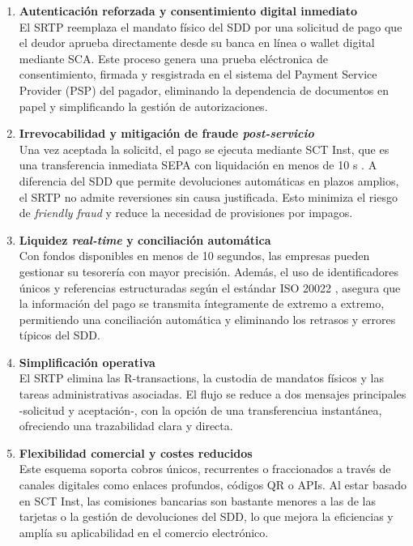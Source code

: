 \begin{enumerate}[label=\alph*)]
  \item \textbf{Autenticación reforzada y consentimiento digital inmediato}\\
      El SRTP reemplaza el mandato físico del SDD por una solicitud de pago que el deudor aprueba directamente desde su banca en línea o wallet digital mediante SCA. Este proceso genera una prueba eléctronica de consentimiento, firmada y resgistrada en el sistema del Payment Service Provider (PSP) del pagador, eliminando la dependencia de documentos en papel y simplificando la gestión de autorizaciones.

  \item \textbf{Irrevocabilidad y mitigación de fraude \emph{post-servicio}}\\
      Una vez aceptada la solicitd, el pago se ejecuta mediante SCT Inst, que es una transferencia inmediata SEPA con liquidación en menos de 10 s \cite{epc_sctinst_2025}. A diferencia del SDD que permite devoluciones automáticas en plazos amplios, el SRTP no admite reversiones sin causa justificada. Esto minimiza el riesgo de \textit{friendly fraud} y reduce la necesidad de provisiones por impagos.

  \item \textbf{Liquidez \emph{real-time} y conciliación automática}\\
      Con fondos disponibles en menos de 10 segundos, las empresas pueden gestionar su tesorería con mayor precisión. Además, el uso de identificadores únicos y referencias estructuradas según el estándar ISO 20022 \cite{iso20022_55005}, asegura que la información del pago se transmita íntegramente de extremo a extremo, permitiendo una conciliación automática y eliminando los retrasos y errores típicos del SDD.

  \item \textbf{Simplificación operativa}\\
      El SRTP elimina las R-transactions, la custodia de mandatos físicos y las tareas administrativas asociadas. El flujo se reduce a dos mensajes principales -solicitud y aceptación-, con la opción de una transferenciua instantánea, ofreciendo una trazabilidad clara y directa.

  \item \textbf{Flexibilidad comercial y costes reducidos}\\
      Este esquema soporta cobros únicos, recurrentes o fraccionados a través de canales digitales como enlaces profundos, códigos QR o APIs. Al estar basado en SCT Inst, las comisiones bancarias son bastante menores a las de las tarjetas o la gestión de devoluciones del SDD, lo que mejora la eficiencias y amplía su aplicabilidad en el comercio electrónico.
\end{enumerate}

